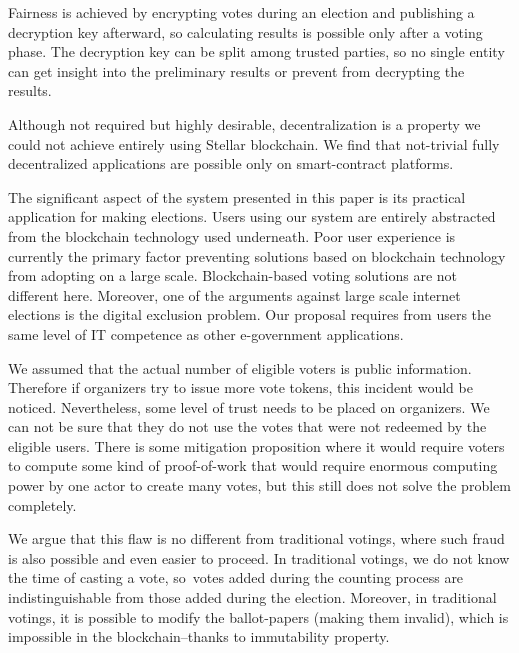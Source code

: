 \documentclass[applsci,article,accept,moreauthors,pdftex]{Definitions/mdpi}
\begin{document}
Fairness is achieved by encrypting votes during an election and publishing a decryption key afterward, so calculating results is possible only after a voting phase. The decryption key can be split among trusted parties, so no single entity can get insight into the preliminary results or prevent from decrypting the results.

Although not required but highly desirable, decentralization is a property we could not achieve entirely using Stellar blockchain. We find that not-trivial fully decentralized applications are possible only on smart-contract platforms. 


The significant aspect of the system presented in this paper is its practical application for making elections. Users using our system are entirely abstracted from the blockchain technology used underneath. Poor user experience is currently the primary factor preventing solutions based on blockchain technology from adopting on a large scale. Blockchain-based voting solutions are not different here. Moreover, one of the arguments against large scale internet elections is the digital exclusion problem. Our proposal requires from users the same level of IT competence as other e-government applications.

We assumed that the actual number of eligible voters is public information. Therefore if organizers try to issue more vote tokens, this incident would be noticed. Nevertheless, some level of trust needs to be placed on organizers. We can not be sure that they do not use the votes that were not redeemed by the eligible users. There is some mitigation proposition where it would require voters to compute some kind of proof-of-work that would require enormous computing power by one actor to create many votes, but this still does not solve the problem completely.

We argue that this flaw is no different from traditional votings, where such fraud is also possible and even easier to proceed. In traditional votings, we do not know the time of casting a vote, so~votes added during the counting process are indistinguishable from those added during the election. Moreover, in traditional votings, it is possible to modify the ballot-papers (making them invalid), which is impossible in the blockchain–thanks to immutability property.
\end{document}
